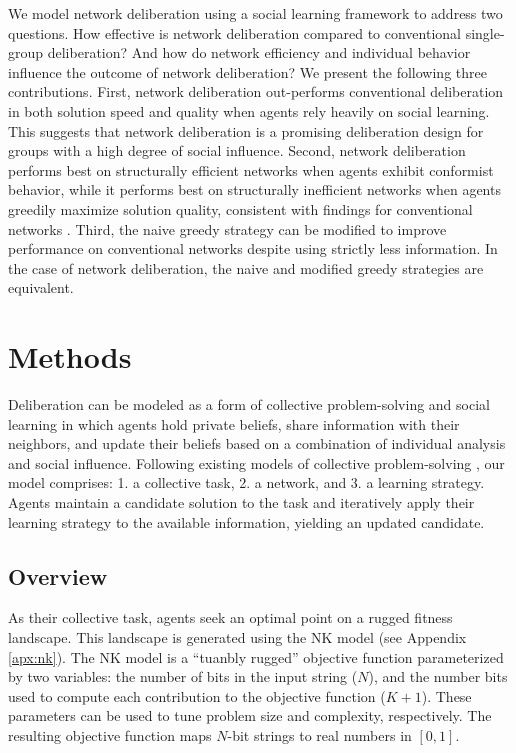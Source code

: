 We model network deliberation using a social learning framework to address two questions. How effective is network deliberation compared to conventional single-group deliberation? And how do network efficiency and individual behavior influence the outcome of network deliberation? We present the following three contributions.
First, network deliberation out-performs conventional deliberation in both solution speed and quality when agents rely heavily on social learning. This suggests that network deliberation is a promising deliberation design for groups with a high degree of social influence. Second, network deliberation performs best on structurally efficient networks when agents exhibit conformist behavior, while it performs best on structurally inefficient networks when agents greedily maximize solution quality, consistent with findings for conventional networks \cite{barkoczi_social_2016}.
Third, the naive greedy strategy can be modified to improve performance on conventional networks despite using strictly less information. In the case of network deliberation, the naive and modified greedy strategies are equivalent.

\section{Methods}

Deliberation can be modeled as a form of collective problem-solving and social learning in which agents hold private beliefs, share information with their neighbors, and update their beliefs based on a combination of individual analysis and social influence.
Following existing models of collective problem-solving \cite{lazer_network_2007, barkoczi_social_2016, gomez_clustering_2019}, our model comprises: 1. a collective task, 2. a network, and 3. a learning strategy.
Agents maintain a candidate solution to the task and iteratively apply their learning strategy to the available information, yielding an updated candidate.

\subsection{Overview}

As their collective task, agents seek an optimal point on a rugged fitness landscape.
This landscape is generated using the NK model \cite{kauffman_towards_1987, weinberger_local_1991} (see Appendix \ref{apx:nk}).
The NK model is a ``tuanbly rugged'' objective function parameterized by two variables:
the number of bits in the input string ($N$),
and the number bits used to compute each contribution to the objective function ($K+1$).
These parameters can be used to tune problem size and complexity, respectively.
The resulting objective function maps $N$-bit strings to real numbers in $[0,1]$.

